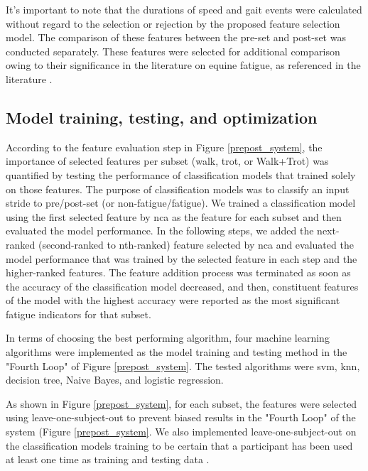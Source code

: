 It's important to note that the durations of speed and gait events were calculated without regard to the selection or rejection by the proposed feature selection model. The comparison of these features between the pre-\gls{set} and post-\gls{set} was conducted separately. These features were selected for additional comparison owing to their significance in the literature on equine fatigue, as referenced in the literature \cite{Cottin2006EffectTraining,Colborne2001ElectromyographicStudy.,Williams2018ElectromyographyTechnology, Pugliese2020EffectStudy,parkes_2019_the,Takahashi2021EffectsRaces}.

\subsection{Model training, testing, and optimization}
\label{methodmodel}

According to the feature evaluation step in Figure \ref{prepost_system}, the importance of selected features per subset (walk, trot, or Walk+Trot) was quantified by testing the performance of classification models that trained solely on those features. The purpose of classification models was to classify an input stride to pre/post-\gls{set} (or non-fatigue/fatigue). We trained a classification model using the first selected feature by \gls{nca} as the feature for each subset and then evaluated the model performance. In the following steps, we added the next-ranked (second-ranked to nth-ranked) feature selected by \gls{nca} and evaluated the model performance that was trained by the selected feature in each step and the higher-ranked features. The feature addition process was terminated as soon as the accuracy of the classification model decreased, and then, constituent features of the model with the highest accuracy were reported as the most significant fatigue indicators for that subset. 

In terms of choosing the best performing algorithm, four machine learning algorithms were implemented as the model training and testing method in the "Fourth Loop" of Figure \ref{prepost_system}. The tested algorithms were \gls{svm}, \gls{knn}, decision tree, Naive Bayes, and logistic regression.

As shown in Figure \ref{prepost_system}, for each subset, the features were selected using leave-one-subject-out \cite{articlevarma} to prevent biased results in the "Fourth Loop" of the system (Figure \ref{prepost_system}. We also implemented leave-one-subject-out on the classification models training to be certain that a participant has been used at least one time as training and testing data \cite{darbandi_2021_using}. 

